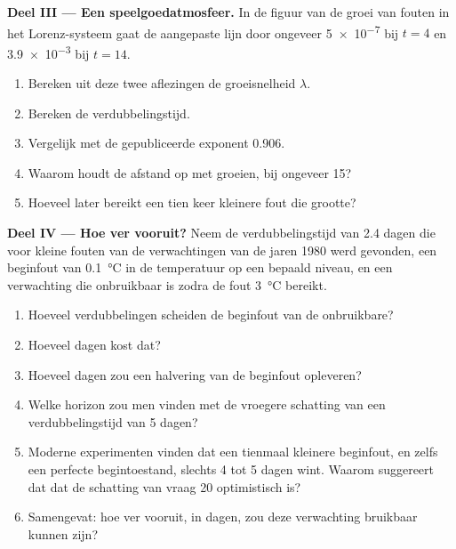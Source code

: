 \begin{problem}
\medskip\noindent\textbf{Deel III --- Een speelgoedatmosfeer.}
In de figuur van de groei van fouten in het Lorenz-systeem gaat de aangepaste lijn door
ongeveer \num{5e-7} bij $t = 4$ en \num{3.9e-3} bij $t = 14$.
\begin{enumerate}[resume]
  \item Bereken uit deze twee aflezingen de groeisnelheid $\lambda$.
  \item Bereken de verdubbelingstijd.
  \item Vergelijk met de gepubliceerde exponent 0.906.
  \item Waarom houdt de afstand op met groeien, bij ongeveer 15?
  \item Hoeveel later bereikt een tien keer kleinere fout die grootte?
\end{enumerate}

\medskip\noindent\textbf{Deel IV --- Hoe ver vooruit?}
Neem de verdubbelingstijd van 2.4 dagen die voor kleine fouten van de verwachtingen van de jaren 1980 werd gevonden, een
beginfout van \qty{0.1}{\celsius} in de temperatuur op een bepaald niveau, en een verwachting die
onbruikbaar is zodra de fout \qty{3}{\celsius} bereikt.
\begin{enumerate}[resume]
  \item Hoeveel verdubbelingen scheiden de beginfout van de onbruikbare?
  \item Hoeveel dagen kost dat?
  \item Hoeveel dagen zou een halvering van de beginfout opleveren?
  \item Welke horizon zou men vinden met de vroegere schatting van een verdubbelingstijd van 5 dagen?
  \item Moderne experimenten vinden dat een tienmaal kleinere beginfout, en zelfs een perfecte
        begintoestand, slechts 4 tot 5 dagen wint. Waarom suggereert dat dat de schatting van
        vraag 20 optimistisch is?
  \item Samengevat: hoe ver vooruit, in dagen, zou deze verwachting bruikbaar kunnen zijn?
\end{enumerate}
\end{problem}
